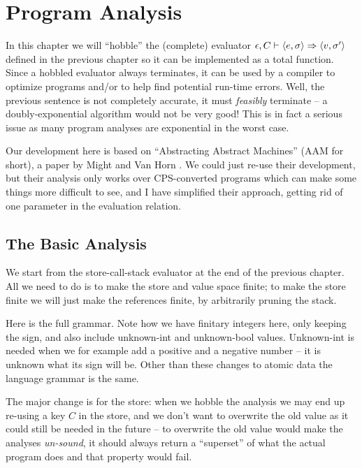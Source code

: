 %
%
\newcommand{\envset}{E}
\chapter{Program Analysis}\label{ch_analysis}

In this chapter we will ``hobble'' the (complete) evaluator $\epsilon, C \vdash \langle e, \sigma \rangle \Rightarrow \langle v, \sigma' \rangle$ defined in the previous chapter so it can be implemented as a total function.  Since a hobbled evaluator always terminates, it can be used by a compiler to optimize programs and/or to help find potential run-time errors.  Well, the previous sentence is not completely accurate, it must \emph{feasibly} terminate -- a doubly-exponential algorithm would not be very good!  This is in fact a serious issue as many program analyses are exponential in the worst case.

Our development here is based on ``Abstracting Abstract Machines'' (AAM for short), a paper by Might and Van Horn \cite{AAM}.  We could just re-use their development, but their analysis only works over CPS-converted programs which can make some things more difficult to see, and I have simplified their approach, getting rid of one parameter in the evaluation relation.

\section{The Basic Analysis}

We start from the store-call-stack evaluator at the end of the previous chapter.  All we need to do is to make the store and value space finite; to make the store finite we will just make the references finite, by arbitrarily pruning the stack.

Here is the full grammar.  Note how we have finitary integers here, only keeping the sign, and also include unknown-int and unknown-bool values.  Unknown-int is needed when we for example add a positive and a negative number -- it is unknown what its sign will be.  Other than these changes to atomic data the language grammar is the same.

The major change is for the store: when we hobble the analysis we may end up re-using a key $C$ in the store, and we don't want to overwrite the old value as it could still be needed in the future -- to overwrite the old value would make the analyses \emph{un-sound}, it should always return a ``superset'' of what the actual program does and that property would fail.

